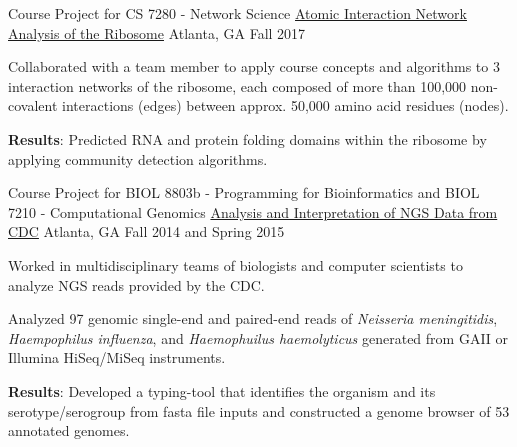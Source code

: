 \begin{cventries}
  \cventry
    {Course Project for CS 7280 - Network Science} %
    {\href{https://nbviewer.jupyter.org/github/NicholasAKovacs/CS7280_Ribosomal_Network_Analysis/blob/master/Jupyter_Notebooks/EsCo_complete_and_SaCe_rPro_analysis/Interaction_Network_Analysis_of_Complete_Ecoli_ribosome_and_Yeast_LSU_rProteins.ipynb}{Atomic Interaction Network Analysis of the Ribosome}} %
    {Atlanta, GA} %
    {Fall 2017} %
    {
      \begin{cvitems} %
      	\item Collaborated with a team member to apply course concepts and algorithms to 3 interaction networks of the ribosome, each composed of more than 100,000 non-covalent interactions (edges) between approx. 50,000 amino acid residues (nodes). 
      	\item {\bf Results}: Predicted RNA and protein folding domains within the ribosome by applying community detection algorithms.
      \end{cvitems}
    }

  \cventry
    {Course Project for BIOL 8803b - Programming for Bioinformatics and BIOL 7210 - Computational Genomics} %
    {\href{http://gbrowse2015.biology.gatech.edu/Home.html}{Analysis and Interpretation of NGS Data from CDC}} %
    {Atlanta, GA} %
    {Fall 2014 and Spring 2015} %
    {
      \begin{cvitems} %
      	\item Worked in multidisciplinary teams of biologists and computer scientists to analyze NGS reads provided by the CDC.
      	\item Analyzed 97 genomic single-end and paired-end reads of \textit{Neisseria meningitidis}, \textit{Haempophilus influenza}, and \textit{Haemophuilus haemolyticus} generated from GAII or Illumina HiSeq/MiSeq instruments.
      	\item {\bf Results}: Developed a typing-tool that identifies the organism and its serotype/serogroup from fasta file inputs and constructed a genome browser of 53 annotated genomes.
      \end{cvitems}
    }


\end{cventries}
